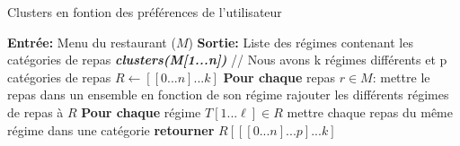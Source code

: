 \documentclass[11pt]{article}
\begin{document}
\begin{algorithm}
    \caption{Clusters en fontion des préférences de l'utilisateur}
    \begin{algorithmic}[1]
    \Statex \textbf{Entrée:} Menu du restaurant ($M$)
    \Statex \textbf{Sortie:} Liste des régimes contenant les catégories de repas
    \State \textbf{\textit{clusters(M[1...n])}}
    \State \hspace{0.5cm} // Nous avons k régimes différents et p catégories de repas
    \State \hspace{0.5cm} $R \leftarrow [[0...n]...k]$
    \State \hspace{0.5cm} \textbf{Pour chaque} repas $r \in M$:
    \State \hspace{1cm} mettre le repas dans un ensemble en fonction de son régime
    \State \hspace{1cm} rajouter les différents régimes de repas à $R$
    \State \hspace{0.5cm} \textbf{Pour chaque} régime $T[1...\ell] \in R$ 
    \State \hspace{1cm} mettre chaque repas du même régime dans une catégorie 
    \State \hspace{0.5cm} \textbf{retourner} $R[[[0...n]...p]...k]$
    \end{algorithmic}
\end{algorithm}

\newpage
\end{document}
